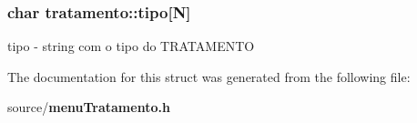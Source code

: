 \subsubsection[{tipo}]{\setlength{\rightskip}{0pt plus 5cm}char tratamento\+::tipo[N]}\label{structtratamento_ad731ce0aa5bc0a56bec42d4887fac138}
tipo -\/ string com o tipo do T\+R\+A\+T\+A\+M\+E\+N\+T\+O 

The documentation for this struct was generated from the following file\+:\begin{DoxyCompactItemize}
\item 
source/{\bf menu\+Tratamento.\+h}\end{DoxyCompactItemize}
